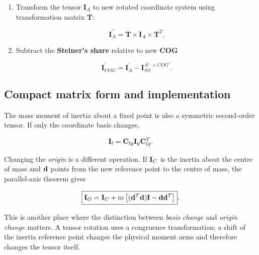 \begin{itemize}
\begin{enumerate}
            \item Transform the tensor $\mathbf{I}_{A}$ to new rotated coordinate
                system using transformation matrix $\mathbf{T}$:

                \begin{equation}
                    \mathbf{I}_{A}^{'} = \mathbf{T} \times \mathbf{I}_{A} \times \mathbf{T}^{T}
                .\end{equation}

            \item Subtract the \textbf{Steiner's share} relative to new \textbf{COG}

                \begin{equation}
                    \mathbf{I}_{COG}^{'} = \mathbf{I}_{A}^{'} - \mathbf{I}_{SS}^{A' \to COG'}
                .\end{equation}

        \end{enumerate}

\end{itemize}


\newpage

\subsection{Compact matrix form and implementation}

The mass moment of inertia about a fixed point is also a symmetric second-order
tensor. If only the coordinate basis changes,

\begin{equation}
    \mathbf{I}_l
    =\mathbf{C}_{lg}\mathbf{I}_g\mathbf{C}_{lg}^{T}.
\end{equation}

Changing the \emph{origin} is a different operation. If $\mathbf{I}_C$ is the inertia
about the centre of mass and $\mathbf{d}$ points from the new reference point to the
centre of mass, the parallel-axis theorem gives

\begin{equation}\label{eq:coord-parallel-axis}
    \boxed{
    \mathbf{I}_O
    =\mathbf{I}_C
    +m\left[
       (\mathbf{d}^{T}\mathbf{d})\mathbf{I}
       -\mathbf{d}\mathbf{d}^{T}
    \right]
    }.
\end{equation}

This is another place where the distinction between \emph{basis change} and
\emph{origin change} matters. A tensor rotation uses a congruence transformation;
a shift of the inertia reference point changes the physical moment arms and
therefore changes the tensor itself.

